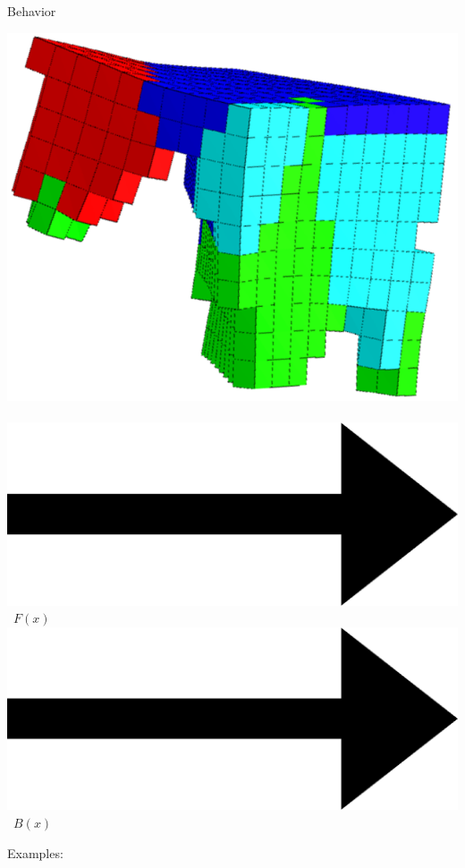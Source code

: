 \documentclass{beamer}
\begin{document}
\begin{frame}{Behavior}
\begin{center}
\includegraphics[height=0.15\textheight]{figures/unshacklingEvolutionFigure2.png}\	
\includegraphics[height=0.05\textheight]{figures/Arrow_east.eps}\	
{\huge $F(x)$ }\	
\includegraphics[height=0.05\textheight]{figures/Arrow_east.eps}\	
{\huge $B(x)$ }\\
\end{center}
\vspace{0.10cm}
Examples:\\
\begin{center}

\end{center}
\end{frame}
\end{document}
